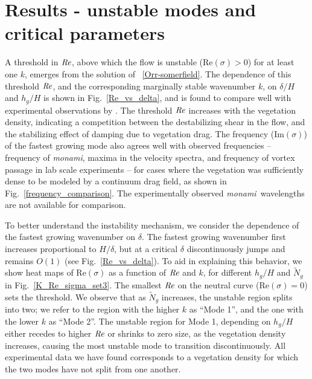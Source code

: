 \documentclass{jfm}
\newcommand{\hg}{h_g}
\newcommand{\Ndg}{\tilde{N}_g}
\newcommand{\monami}{\textit{monami}}
\begin{document}
\section{Results - unstable modes and critical parameters}
A threshold in $\mbox{\textit{Re}}$, above which the flow is unstable (Re$(\sigma)>0$) for at least one $k$, emerges from the solution of ~\eqref{Orr-somerfield}. 
The dependence of this threshold $\mbox{\textit{Re}}$, and the corresponding marginally stable wavenumber $k$, on $\delta/H$ and $\hg/H$ is shown in Fig.~\ref{Re_vs_delta}, and is found to compare well with experimental observations by \cite{Ghisal02}.
The threshold $\mbox{\textit{Re}}$ increases with the vegetation density, indicating a competition between the destabilizing shear in the flow, and the stabilizing effect of damping due to vegetation drag.
The frequency (Im$(\sigma)$) of the fastest growing mode also agrees well with observed frequencies -- frequency of \monami, maxima in the velocity spectra, and frequency of vortex passage in lab scale experiments \citep{Ghisal02} -- for cases where the vegetation was sufficiently dense to be modeled by a continuum drag field, as shown in Fig.~\ref{frequency_comparison}.  
The experimentally observed \monami ~wavelengths are not available for comparison.

To better understand the instability mechanism, we consider the dependence of the fastest growing wavenumber on $\delta$.
The fastest growing wavenumber first increases proportional to $H/\delta$, but at a critical $\delta$ discontinuously jumps and remains $O(1)$ (see Fig.~\ref{Re_vs_delta}). 
To aid in explaining this behavior, we show heat maps of Re$(\sigma)$ as a function of $\mbox{\textit{Re}}$ and $k$, for different $\hg/H$ and $\Ndg$ in Fig.~\ref{K_Re_sigma_set3}. 
The smallest $\mbox{\textit{Re}}$ on the neutral curve (Re$(\sigma)=0$) sets the threshold. 
We observe that as $\Ndg$ increases, the unstable region splits into two; we refer to the region with the higher $k$ as ``Mode 1'', and the one with the lower $k$ as ``Mode 2''. 
The unstable region for Mode 1, depending on $\hg/H$ either recedes to higher $\mbox{\textit{Re}}$ or shrinks to zero size, as the vegetation density increases, causing the most unstable mode to transition discontinuously.
All experimental data we have found corresponds to a vegetation density for which the two modes have not split from one another. 
\end{document}
